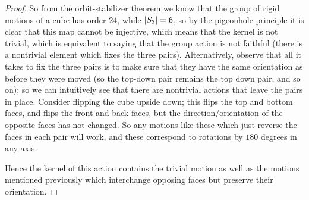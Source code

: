 \documentclass[11pt]{article}
\begin{document}
\begin{enumerate}
\begin{proof}
      So from the orbit-stabilizer theorem we know that the group of rigid motions of a cube has order $24$, while $\abs{S_3} = 6$, so by the pigeonhole principle it is clear that this map cannot be injective, which means that the kernel is not trivial, which is equivalent to saying that the group action is not faithful (there is a nontrivial element which fixes the three pairs). Alternatively, observe that all it takes to fix the three pairs is to make sure that they have the same orientation as before they were moved (so the top-down pair remains the top down pair, and so on); so we can intuitively see that there are nontrivial actions that leave the pairs in place. Consider flipping the cube upside down; this flips the top and bottom faces, and flips the front and back faces, but the direction/orientation of the opposite faces has not changed. So any motions like these which just reverse the faces in each pair will work, and these correspond to rotations by $180$ degrees in any axis.

      Hence the kernel of this action contains the trivial motion as well as the motions mentioned previously which interchange opposing faces but preserve their orientation.
    \end{proof}
\end{enumerate}
\end{document}
